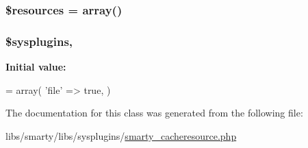 \subsubsection[{\$resources}]{\setlength{\rightskip}{0pt plus 5cm}\$resources = array()\hspace{0.3cm}{\ttfamily [static]}}\label{class_smarty___cache_resource_ad57e7e99506ffd448d98e036b1a8da50}
\hypertarget{class_smarty___cache_resource_a686d06923a58590ced2aae1c066d977e}{}
\subsubsection[{\$sysplugins}]{\setlength{\rightskip}{0pt plus 5cm}\$sysplugins\hspace{0.3cm}{\ttfamily [static]}, {\ttfamily [protected]}}\label{class_smarty___cache_resource_a686d06923a58590ced2aae1c066d977e}
{\bfseries Initial value\+:}
\begin{DoxyCode}
= array(
        \textcolor{stringliteral}{'file'} => \textcolor{keyword}{true},
    )
\end{DoxyCode}


The documentation for this class was generated from the following file\+:\begin{DoxyCompactItemize}
\item 
libs/smarty/libs/sysplugins/\hyperlink{smarty__cacheresource_8php}{smarty\+\_\+cacheresource.\+php}\end{DoxyCompactItemize}
